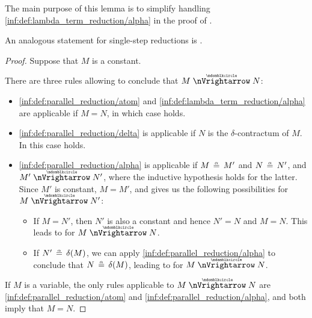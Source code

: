 \begin{comments}
  \item The main purpose of this lemma is to simplify handling \ref{inf:def:lambda_term_reduction/alpha} in the proof of .

  \item An analogous statement for single-step reductions is .
\end{comments}
\begin{proof}
   Suppose that \( M \) is a constant.

  There are three rules allowing to conclude that \( M \ppred N \):
  \begin{itemize}
    \item \ref{inf:def:parallel_reduction/atom} and \ref{inf:def:lambda_term_reduction/alpha} are applicable if \( M = N \), in which case  holds.

    \item \ref{inf:def:parallel_reduction/delta} is applicable if \( N \) is the \( \delta \)-contractum of \( M \). In this case  holds.

    \item \ref{inf:def:parallel_reduction/alpha} is applicable if \( M \aequiv M' \) and \( N \aequiv N' \), and \( M' \ppred N' \), where the inductive hypothesis holds for the latter. Since \( M' \) is constant, \( M = M' \), and  gives us the following possibilities for \( M \ppred N' \):

    \begin{itemize}
      \item If \( M = N' \), then \( N' \) is also a constant and hence \( N' = N \) and \( M = N \). This leads to  for \( M \ppred N \).

      \item If \( N' \aequiv \op*{\delta}(M) \), we can apply \ref{inf:def:parallel_reduction/alpha} to conclude that \( N \aequiv \op*{\delta}(M) \), leading to  for \( M \ppred N \).
    \end{itemize}
  \end{itemize}

   If \( M \) is a variable, the only rules applicable to \( M \ppred N \) are \ref{inf:def:parallel_reduction/atom} and \ref{inf:def:parallel_reduction/alpha}, and both imply that \( M = N \).


\end{proof}
